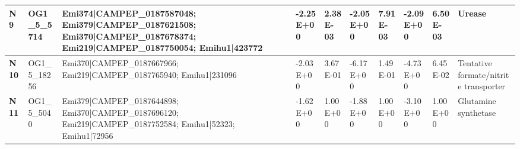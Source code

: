 \begin{landscape}
\begin{center}
\begin{footnotesize}
\begin{longtable}{|p{0.5cm}|p{1.5cm}|p{4cm}|l|l|l|l|l|l|l|}
\textbf{N9}  & OG1\_5\_5714  & Emi374|CAMPEP\_0187587048; Emi379|CAMPEP\_0187621508; Emi370|CAMPEP\_0187678374; Emi219|CAMPEP\_0187750054; Emihu1|423772                                                                                                                                                                                                                                                                                                                                                                                                                                                                                                                & -2.25E+00 & 2.38E-03 & -2.05E+00 & 7.91E-03 & -2.09E+00 & 6.50E-03 & Urease                                                                       \\ \hline
\textbf{N10} & OG1\_5\_18256 & Emi370|CAMPEP\_0187667966; Emi219|CAMPEP\_0187765940; Emihu1|231096                                                                                                                                                                                                                                                                                                                                                                                                                                                                                                                                                                      & -2.03E+00 & 3.67E-01 & -6.17E+00 & 1.49E-01 & -4.73E+00 & 6.45E-02 & Tentative formate/nitrite transporter                                        \\ \hline
\textbf{N11} & OG1\_5\_5040  & Emi379|CAMPEP\_0187644898; Emi370|CAMPEP\_0187696120; Emi219|CAMPEP\_0187752584; Emihu1|52323; Emihu1|72956                                                                                                                                                                                                                                                                                                                                                                                                                                                                                                                              & -1.62E+00 & 1.00E+00 & -1.88E+00 & 1.00E+00 & -3.10E+00 & 1.00E+00 & Glutamine synthetase                                                         \\ \hline

\end{longtable}
\end{footnotesize}
\end{center}
\end{landscape}
